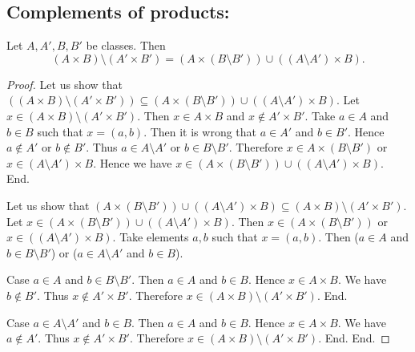 \documentclass[../set-theory.tex]{subfiles}
\begin{document}
  \subsection*{Complements of products:}

  \begin{forthel}
    \begin{proposition}
      Let $A, A', B, B'$ be classes.
      Then \[ (A \times B) \setminus (A' \times B') =
      (A \times (B \setminus B')) \cup ((A \setminus A') \times B). \]
    \end{proposition}
    \begin{proof}
      Let us show that $((A \times B) \setminus (A' \times B')) \subseteq (A \times (B \setminus B')) \cup ((A \setminus A') \times B)$.
        Let $x \in (A \times B) \setminus (A' \times B')$.
        Then $x \in A \times B$ and $x \notin A' \times B'$.
        Take $a \in A$ and $b \in B$ such that $x = (a, b)$.
        Then it is wrong that $a \in A'$ and $b \in B'$.
        Hence $a \notin A'$ or $b \notin B'$.
        Thus $a \in A \setminus A'$ or $b \in B \setminus B'$.
        Therefore $x \in A \times (B \setminus B')$ or $x \in (A \setminus A') \times B$.
        Hence we have $x \in (A \times (B \setminus B')) \cup ((A \setminus A') \times B)$.
      End.

      Let us show that $(A \times (B \setminus B')) \cup ((A \setminus A') \times B) \subseteq (A \times B) \setminus (A' \times B')$.
        Let $x \in (A \times (B \setminus B')) \cup ((A \setminus A') \times B)$.
        Then $x \in (A \times (B \setminus B'))$ or $x \in ((A \setminus A') \times B)$.
        Take elements $a,b$ such that $x = (a, b)$.
        Then ($a \in A$ and $b \in B \setminus B'$) or ($a \in A \setminus A'$ and $b \in B$).

        Case $a \in A$ and $b \in B \setminus B'$.
          Then $a \in A$ and $b \in B$.
          Hence $x \in A \times B$.
          We have $b \notin B'$.
          Thus $x \notin A' \times B'$.
          Therefore $x \in (A \times B) \setminus (A' \times B')$.
        End.

        Case $a \in A \setminus A'$ and $b \in B$.
          Then $a \in A$ and $b \in B$.
          Hence $x \in A \times B$.
          We have $a \notin A'$.
          Thus $x \notin A' \times B'$.
          Therefore $x \in (A \times B) \setminus (A' \times B')$.
        End.
      End.
    \end{proof}
  \end{forthel}
\end{document}
